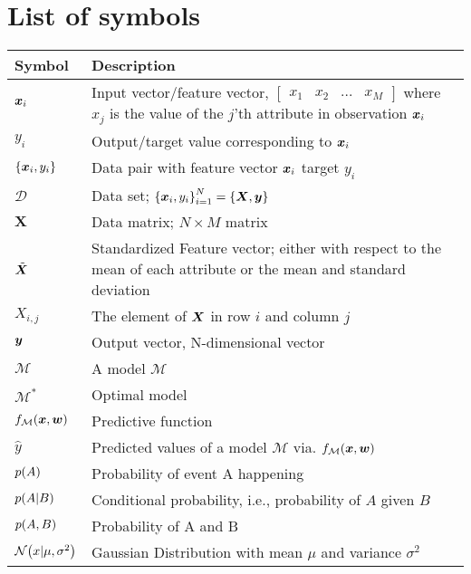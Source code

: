 \chapter*{List of symbols}
\begin{center}
\begin{tabular}{p{2cm}p{12cm}}
\textbf{Symbol}    & \textbf{Description}   \\
\hline\hline
$\bm{x}_i$ & Input vector/feature vector, $[\begin{array}{cccc}
    x_1 & x_2 & ... & x_M
\end{array}]$ where $x_j$ is the value of the $j$'th attribute in observation $\bm{x}_i$\\
$y_i$ & Output/target value corresponding to $\bm{x}_i$ \\
$\left\{\bm{x}_i,y_i\right\}$ & Data pair with feature vector $\bm{x}_i$  target $y_i$\\
$\mathcal{D}$                       & Data set; $\left\{\bm{x}_i,y_i\right\}_{i=1}^{N}=\left\{ {\bm{X},\bm{y}} \right\}$  \\
$\boldsymbol{X}$ & Data matrix; $N \times M$ matrix \\
$\tilde{\bm{X}}$ & Standardized Feature vector; either with respect to the mean of each attribute or the mean and standard deviation  \\
$X_{i,j}$ & The element of $\bm{X}$ in row $i$ and column $j$ \\
$\bm{y}$ & Output vector, N-dimensional vector  \\
$\mathcal{M}$                       & A model $\mathcal{M}$        \\
$\mathcal{M}^*$                     & Optimal model \\
$f_{\mathcal{M}}\qty(\bm{x},\boldsymbol{w})$    & Predictive function \\
$\hat{y}$                           & Predicted values of a model $\mathcal{M}$ via. $f_{\mathcal{M}}\qty(\bm{x},\boldsymbol{w})$ \\
$p\qty(A)$                          & Probability of event A happening                         \\
$p\qty(A | B )$                     & Conditional probability, i.e., probability of $A$ given $B$           \\
$p\qty(A,B)$                        & Probability of A and B             \\
$\mathcal{N}\qty(x | \mu , \sigma^2)$           & Gaussian Distribution with mean $\mu$ and variance $\sigma^2$  \\

\end{tabular}
\end{center}
